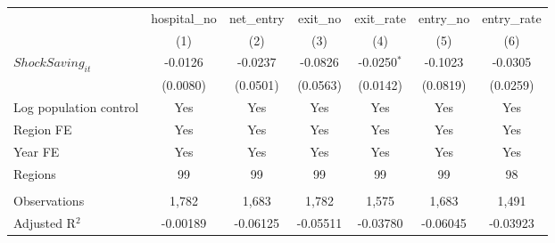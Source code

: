 \begingroup
\centering
\begin{tabular}{lcccccc}
   \toprule
                          & hospital\_no  & net\_entry  & exit\_no  & exit\_rate    & entry\_no  & entry\_rate \\    
                          & (1)           & (2)         & (3)       & (4)           & (5)        & (6)\\  
   \midrule 
   $ShockSaving_{it}$     & -0.0126       & -0.0237     & -0.0826   & -0.0250$^{*}$ & -0.1023    & -0.0305\\   
                          & (0.0080)      & (0.0501)    & (0.0563)  & (0.0142)      & (0.0819)   & (0.0259)\\   
   Log population control & Yes           & Yes         & Yes       & Yes           & Yes        & Yes\\  
   Region FE              & Yes           & Yes         & Yes       & Yes           & Yes        & Yes\\  
   Year FE                & Yes           & Yes         & Yes       & Yes           & Yes        & Yes\\  
   Regions                & 99            & 99          & 99        & 99            & 99         & 98\\  
    \\
   Observations           & 1,782         & 1,683       & 1,782     & 1,575         & 1,683      & 1,491\\  
   Adjusted R$^2$         & -0.00189      & -0.06125    & -0.05511  & -0.03780      & -0.06045   & -0.03923\\  
   \bottomrule
\end{tabular}
\par\endgroup
